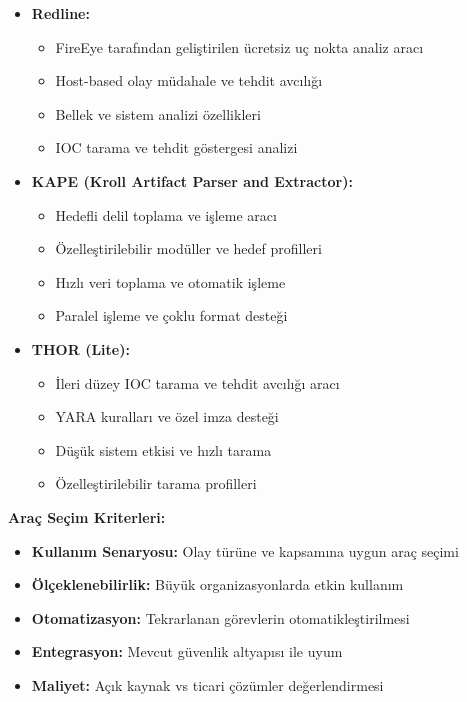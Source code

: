 \begin{itemize}
    \item \textbf{Redline:}
    \begin{itemize}
        \item FireEye tarafından geliştirilen ücretsiz uç nokta analiz aracı
        \item Host-based olay müdahale ve tehdit avcılığı
        \item Bellek ve sistem analizi özellikleri
        \item IOC tarama ve tehdit göstergesi analizi
    \end{itemize}

    \item \textbf{KAPE (Kroll Artifact Parser and Extractor):}
    \begin{itemize}
        \item Hedefli delil toplama ve işleme aracı
        \item Özelleştirilebilir modüller ve hedef profilleri
        \item Hızlı veri toplama ve otomatik işleme
        \item Paralel işleme ve çoklu format desteği
    \end{itemize}

    \item \textbf{THOR (Lite):}
    \begin{itemize}
        \item İleri düzey IOC tarama ve tehdit avcılığı aracı
        \item YARA kuralları ve özel imza desteği
        \item Düşük sistem etkisi ve hızlı tarama
        \item Özelleştirilebilir tarama profilleri
    \end{itemize}
\end{itemize}

\textbf{Araç Seçim Kriterleri:}
\begin{itemize}
    \item \textbf{Kullanım Senaryosu:} Olay türüne ve kapsamına uygun araç seçimi
    \item \textbf{Ölçeklenebilirlik:} Büyük organizasyonlarda etkin kullanım
    \item \textbf{Otomatizasyon:} Tekrarlanan görevlerin otomatikleştirilmesi
    \item \textbf{Entegrasyon:} Mevcut güvenlik altyapısı ile uyum
    \item \textbf{Maliyet:} Açık kaynak vs ticari çözümler değerlendirmesi
\end{itemize}


